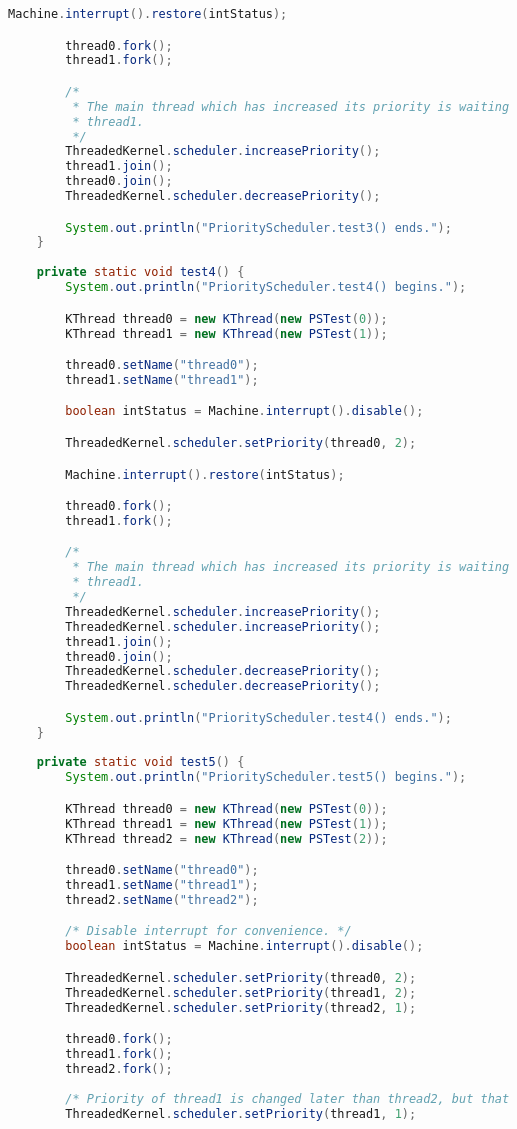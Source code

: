 \documentclass{article}
\begin{document}
\begin{lstlisting}[language=java]
		Machine.interrupt().restore(intStatus);

		thread0.fork();
		thread1.fork();

		/*
		 * The main thread which has increased its priority is waiting for
		 * thread1.
		 */
		ThreadedKernel.scheduler.increasePriority();
		thread1.join();
		thread0.join();
		ThreadedKernel.scheduler.decreasePriority();

		System.out.println("PriorityScheduler.test3() ends.");
	}
	
	private static void test4() {
		System.out.println("PriorityScheduler.test4() begins.");

		KThread thread0 = new KThread(new PSTest(0));
		KThread thread1 = new KThread(new PSTest(1));

		thread0.setName("thread0");
		thread1.setName("thread1");

		boolean intStatus = Machine.interrupt().disable();

		ThreadedKernel.scheduler.setPriority(thread0, 2);

		Machine.interrupt().restore(intStatus);

		thread0.fork();
		thread1.fork();

		/*
		 * The main thread which has increased its priority is waiting for
		 * thread1.
		 */
		ThreadedKernel.scheduler.increasePriority();
		ThreadedKernel.scheduler.increasePriority();
		thread1.join();
		thread0.join();
		ThreadedKernel.scheduler.decreasePriority();
		ThreadedKernel.scheduler.decreasePriority();

		System.out.println("PriorityScheduler.test4() ends.");
	}
	
	private static void test5() {
		System.out.println("PriorityScheduler.test5() begins.");

		KThread thread0 = new KThread(new PSTest(0));
		KThread thread1 = new KThread(new PSTest(1));
		KThread thread2 = new KThread(new PSTest(2));

		thread0.setName("thread0");
		thread1.setName("thread1");
		thread2.setName("thread2");

		/* Disable interrupt for convenience. */
		boolean intStatus = Machine.interrupt().disable();

		ThreadedKernel.scheduler.setPriority(thread0, 2);
		ThreadedKernel.scheduler.setPriority(thread1, 2);
		ThreadedKernel.scheduler.setPriority(thread2, 1);

		thread0.fork();
		thread1.fork();
		thread2.fork();
		
		/* Priority of thread1 is changed later than thread2, but that thread is enqueued earlier. */
		ThreadedKernel.scheduler.setPriority(thread1, 1);


\end{lstlisting}
\end{document}
